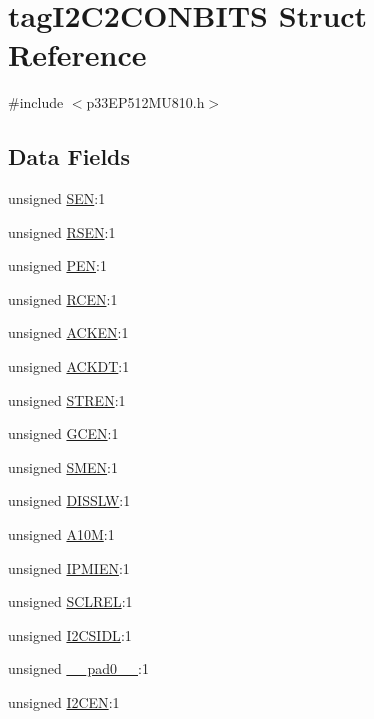 \hypertarget{structtag_i2_c2_c_o_n_b_i_t_s}{}\section{tag\+I2\+C2\+C\+O\+N\+B\+I\+TS Struct Reference}
\label{structtag_i2_c2_c_o_n_b_i_t_s}


{\ttfamily \#include $<$p33\+E\+P512\+M\+U810.\+h$>$}

\subsection*{Data Fields}
\begin{DoxyCompactItemize}
\item 
unsigned \hyperlink{structtag_i2_c2_c_o_n_b_i_t_s_a425d7dbb9fc0cc96308f1deb27f8a196}{S\+EN}\+:1
\item 
unsigned \hyperlink{structtag_i2_c2_c_o_n_b_i_t_s_a209f2e7f4c953160482a183deb500100}{R\+S\+EN}\+:1
\item 
unsigned \hyperlink{structtag_i2_c2_c_o_n_b_i_t_s_a9f5c14f4c38e3f6682a0620dc8bcf5cf}{P\+EN}\+:1
\item 
unsigned \hyperlink{structtag_i2_c2_c_o_n_b_i_t_s_a4021cec43d52c6ef14d43d5d4fb6500e}{R\+C\+EN}\+:1
\item 
unsigned \hyperlink{structtag_i2_c2_c_o_n_b_i_t_s_ac5329500a2097d0eeabcd2167e44cd97}{A\+C\+K\+EN}\+:1
\item 
unsigned \hyperlink{structtag_i2_c2_c_o_n_b_i_t_s_a06a72e77e6b23ea89089b6d87675b2ea}{A\+C\+K\+DT}\+:1
\item 
unsigned \hyperlink{structtag_i2_c2_c_o_n_b_i_t_s_a815f4f81099ee6f7f25c4712495b47f9}{S\+T\+R\+EN}\+:1
\item 
unsigned \hyperlink{structtag_i2_c2_c_o_n_b_i_t_s_ad78199700673d1b061fded298551acf7}{G\+C\+EN}\+:1
\item 
unsigned \hyperlink{structtag_i2_c2_c_o_n_b_i_t_s_a33a132b33aa2680e4316437c8fc45c4a}{S\+M\+EN}\+:1
\item 
unsigned \hyperlink{structtag_i2_c2_c_o_n_b_i_t_s_a134d731ffaca1ffa232acf13b89b56f7}{D\+I\+S\+S\+LW}\+:1
\item 
unsigned \hyperlink{structtag_i2_c2_c_o_n_b_i_t_s_a745eaf048d145432b354dd30faac6066}{A10M}\+:1
\item 
unsigned \hyperlink{structtag_i2_c2_c_o_n_b_i_t_s_a1e1c02a6b9d91b9a215e275da0a183f8}{I\+P\+M\+I\+EN}\+:1
\item 
unsigned \hyperlink{structtag_i2_c2_c_o_n_b_i_t_s_a1beacca4856958a1845ff80eaee355ef}{S\+C\+L\+R\+EL}\+:1
\item 
unsigned \hyperlink{structtag_i2_c2_c_o_n_b_i_t_s_a50bdcde9531e024ad16dbac8d5dce5aa}{I2\+C\+S\+I\+DL}\+:1
\item 
unsigned \hyperlink{structtag_i2_c2_c_o_n_b_i_t_s_adf71f3d8410c1f1dbbc96680a92c49af}{\+\_\+\+\_\+pad0\+\_\+\+\_\+}\+:1
\item 
unsigned \hyperlink{structtag_i2_c2_c_o_n_b_i_t_s_ac49e41fa50e35b0c9fed9a7d0b52f5a8}{I2\+C\+EN}\+:1
\end{DoxyCompactItemize}


